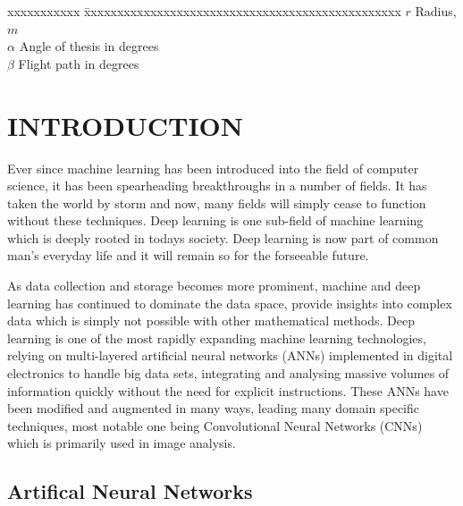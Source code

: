 \documentclass[BTech]{iitpdiss}
\begin{document}
\begin{singlespace}
	\begin{tabbing}
		xxxxxxxxxxx \= xxxxxxxxxxxxxxxxxxxxxxxxxxxxxxxxxxxxxxxxxxxxxxxx \kill
		\textbf{$r$}  \> Radius, $m$ \\
		\textbf{$\alpha$}  \> Angle of thesis in degrees \\
		\textbf{$\beta$}   \> Flight path in degrees \\
	\end{tabbing}
\end{singlespace}

\pagebreak
\clearpage




\chapter{INTRODUCTION}
\label{chap:intro}

Ever since machine learning has been introduced into the field of computer science, it has been spearheading breakthroughs in a number of fields. It has taken the world by storm and now, many fields will simply cease to function without these techniques. Deep learning is one sub-field of machine learning which is deeply rooted in todays society. Deep learning is now part of common man's everyday life and it will remain so for the forseeable future.

As data collection and storage becomes more prominent, machine and deep learning has continued to dominate the data space, provide insights into complex data which is simply not possible with other mathematical methods. Deep learning is one of the most rapidly expanding machine learning technologies, relying on multi-layered artificial neural networks (ANNs) implemented in digital electronics to handle big data sets, integrating and analysing massive volumes of information quickly without the need for explicit instructions. These ANNs have been modified and augmented in many ways, leading many domain specific techniques, most notable one being Convolutional Neural Networks (CNNs) which is primarily used in image analysis.
\section{Artifical Neural Networks}
\end{document}
